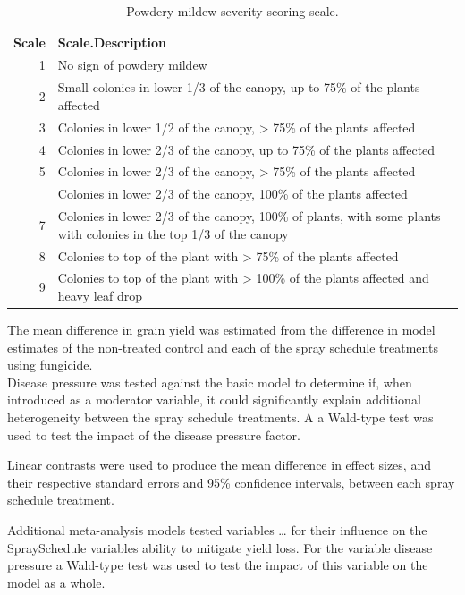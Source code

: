 \documentclass[agronomy,article,submit,moreauthors,pdftex]{mdpi}
\begin{document}
\begin{table}

\caption{\label{tab:Table2}Powdery mildew severity scoring scale.}
\centering
\begin{tabular}[t]{rl}
\toprule
Scale & Scale.Description\\
\midrule
1 & No sign of powdery mildew\\
2 & Small colonies in lower 1/3 of the canopy, up to 75\% of the plants affected\\
3 & Colonies in lower 1/2 of the canopy, > 75\% of the plants affected\\
4 & Colonies in lower 2/3 of the canopy, up to 75\% of the plants affected\\
5 & Colonies in lower 2/3 of the canopy, > 75\% of the plants affected\\
\addlinespace
6 & Colonies in lower 2/3 of the canopy, 100\% of the plants affected\\
7 & Colonies in lower 2/3 of the canopy, 100\% of plants, with some plants with colonies in the top 1/3 of the canopy\\
8 & Colonies to top of the plant with > 75\% of the plants affected\\
9 & Colonies to top of the plant with > 100\% of the plants affected and heavy leaf drop\\
\bottomrule
\end{tabular}
\end{table}

The mean difference in grain yield was estimated from the difference in model estimates of the non-treated control and each of the spray schedule treatments using fungicide.\\
Disease pressure was tested against the basic model to determine if, when introduced as a moderator variable, it could significantly explain additional heterogeneity between the spray schedule treatments.
A a Wald-type test was used to test the impact of the disease pressure factor.

Linear contrasts were used to produce the mean difference in effect sizes, and their respective standard errors and 95\% confidence intervals, between each spray schedule treatment.

Additional meta-analysis models tested variables \ldots{} for their influence on the SpraySchedule variables ability to mitigate yield loss.
For the variable disease pressure a Wald-type test was used to test the impact of this variable on the model as a whole.
\end{document}
